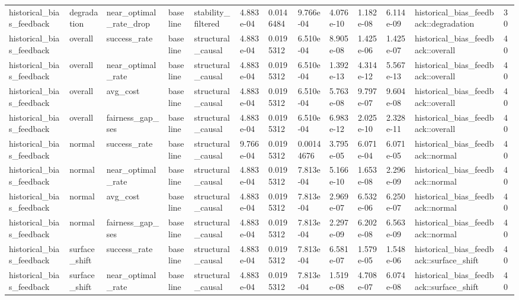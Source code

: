 \begin{tabular}{lllllllllllll}
historical\_bias\_feedback & degradation & near\_optimal\_rate\_drop & baseline & stability\_filtered & 4.883e-04 & 0.0146484 & 9.766e-04 & 4.076e-10 & 1.182e-08 & 6.114e-09 & historical\_bias\_feedback::degradation & 30 \\
historical\_bias\_feedback & overall & success\_rate & baseline & structural\_causal & 4.883e-04 & 0.0195312 & 6.510e-04 & 8.905e-08 & 1.425e-06 & 1.425e-07 & historical\_bias\_feedback::overall & 40 \\
historical\_bias\_feedback & overall & near\_optimal\_rate & baseline & structural\_causal & 4.883e-04 & 0.0195312 & 6.510e-04 & 1.392e-13 & 4.314e-12 & 5.567e-13 & historical\_bias\_feedback::overall & 40 \\
historical\_bias\_feedback & overall & avg\_cost & baseline & structural\_causal & 4.883e-04 & 0.0195312 & 6.510e-04 & 5.763e-08 & 9.797e-07 & 9.604e-08 & historical\_bias\_feedback::overall & 40 \\
historical\_bias\_feedback & overall & fairness\_gap\_ses & baseline & structural\_causal & 4.883e-04 & 0.0195312 & 6.510e-04 & 6.983e-12 & 2.025e-10 & 2.328e-11 & historical\_bias\_feedback::overall & 40 \\
historical\_bias\_feedback & normal & success\_rate & baseline & structural\_causal & 9.766e-04 & 0.0195312 & 0.00144676 & 3.795e-05 & 6.071e-04 & 6.071e-05 & historical\_bias\_feedback::normal & 40 \\
historical\_bias\_feedback & normal & near\_optimal\_rate & baseline & structural\_causal & 4.883e-04 & 0.0195312 & 7.813e-04 & 5.166e-10 & 1.653e-08 & 2.296e-09 & historical\_bias\_feedback::normal & 40 \\
historical\_bias\_feedback & normal & avg\_cost & baseline & structural\_causal & 4.883e-04 & 0.0195312 & 7.813e-04 & 2.969e-07 & 6.532e-06 & 6.250e-07 & historical\_bias\_feedback::normal & 40 \\
historical\_bias\_feedback & normal & fairness\_gap\_ses & baseline & structural\_causal & 4.883e-04 & 0.0195312 & 7.813e-04 & 2.297e-09 & 6.202e-08 & 6.563e-09 & historical\_bias\_feedback::normal & 40 \\
historical\_bias\_feedback & surface\_shift & success\_rate & baseline & structural\_causal & 4.883e-04 & 0.0195312 & 7.813e-04 & 6.581e-07 & 1.579e-05 & 1.548e-06 & historical\_bias\_feedback::surface\_shift & 40 \\
historical\_bias\_feedback & surface\_shift & near\_optimal\_rate & baseline & structural\_causal & 4.883e-04 & 0.0195312 & 7.813e-04 & 1.519e-08 & 4.708e-07 & 6.074e-08 & historical\_bias\_feedback::surface\_shift & 40 \\

\end{tabular}
